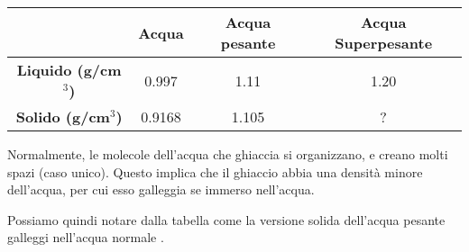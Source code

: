 \documentclass[a4paper]{article}
\begin{document}
\begin{center}
    \bgroup{}
    \def\arraystretch{1.25}
    \begin{tabular}{ |c|c|c|c| }
        \hline
        & \textbf{Acqua} & \textbf{Acqua pesante} & \textbf{Acqua Superpesante} \\
        \hline
        \textbf{Liquido (g/cm\(^3\))} & 0.997 & 1.11 & 1.20 \\
        \hline
        \textbf{Solido (g/cm\(^3\))} & 0.9168 & 1.105 & ? \\
        \hline
    \end{tabular}
    \egroup{}
\end{center}

Normalmente, le molecole dell'acqua che ghiaccia si organizzano, e creano molti spazi (caso unico).
Questo implica che il ghiaccio abbia una densità minore dell'acqua, per cui esso galleggia se immerso nell'acqua.

Possiamo quindi notare dalla tabella come la versione solida dell'acqua pesante galleggi
nell'acqua normale \cite{deuterated-water}.

\nocite{*} %

\printbibliography
\end{document}
